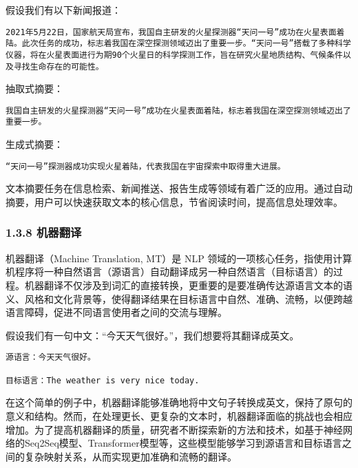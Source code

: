 \documentclass[
]{article}
\begin{document}
假设我们有以下新闻报道：

\begin{verbatim}
2021年5月22日，国家航天局宣布，我国自主研发的火星探测器“天问一号”成功在火星表面着陆。此次任务的成功，标志着我国在深空探测领域迈出了重要一步。“天问一号”搭载了多种科学仪器，将在火星表面进行为期90个火星日的科学探测工作，旨在研究火星地质结构、气候条件以及寻找生命存在的可能性。
\end{verbatim}

抽取式摘要：

\begin{verbatim}
我国自主研发的火星探测器“天问一号”成功在火星表面着陆，标志着我国在深空探测领域迈出了重要一步。
\end{verbatim}

生成式摘要：

\begin{verbatim}
“天问一号”探测器成功实现火星着陆，代表我国在宇宙探索中取得重大进展。
\end{verbatim}

文本摘要任务在信息检索、新闻推送、报告生成等领域有着广泛的应用。通过自动摘要，用户可以快速获取文本的核心信息，节省阅读时间，提高信息处理效率。

\subsubsection{1.3.8 机器翻译}\label{ux673aux5668ux7ffbux8bd1}

机器翻译（Machine Translation, MT）是 NLP
领域的一项核心任务，指使用计算机程序将一种自然语言（源语言）自动翻译成另一种自然语言（目标语言）的过程。机器翻译不仅涉及到词汇的直接转换，更重要的是要准确传达源语言文本的语义、风格和文化背景等，使得翻译结果在目标语言中自然、准确、流畅，以便跨越语言障碍，促进不同语言使用者之间的交流与理解。

假设我们有一句中文：``今天天气很好。''，我们想要将其翻译成英文。

\begin{verbatim}
源语言：今天天气很好。

目标语言：The weather is very nice today.
\end{verbatim}

在这个简单的例子中，机器翻译能够准确地将中文句子转换成英文，保持了原句的意义和结构。然而，在处理更长、更复杂的文本时，机器翻译面临的挑战也会相应增加。为了提高机器翻译的质量，研究者不断探索新的方法和技术，如基于神经网络的Seq2Seq模型、Transformer模型等，这些模型能够学习到源语言和目标语言之间的复杂映射关系，从而实现更加准确和流畅的翻译。
\end{document}
